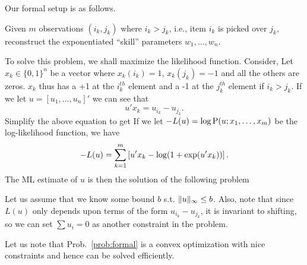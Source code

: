 \documentclass[letterpaper, 11pt, reqno]{amsart}
\begin{document}
Our formal setup is as follows.
\begin{problem}
\label{prob:formal}
Given $m$ observations $(i_k, j_k)$ where $i_k > j_k$, i.e., item $i_k$ is picked over $j_k$, reconstruct the exponentiated ``skill'' parameters $w_1, \ldots, w_n$.
\end{problem}
To solve this problem, we shall maximize the likelihood function. Consider,
Let $x_k \in \{ 0,1\}^n$ be a vector where $x_k(i_k) = 1$, $x_k(j_k) = -1$ and all the others are zeros. $x_k$ thus has a +1 at the $i_k^{th}$ element and a -1 at the $j_k^{th}$ element if $i_k > j_k$. If we let $u = [u_1, \ldots, u_n]'$ we can see that
$$
u' x_k = u_{i_k} - u_{j_k}.
$$
Simplify the above equation to get
If we let $-L(u) = \log \P(u; x_1, \ldots, x_m)$ be the log-likelihood function, we have
$$
-L(u) = \sum_{k=1}^m \sqbrac{u' x_k - \log(1+\exp(u'x_k))}.
$$
The ML estimate of $u$ is then the solution of the following problem
\begin{remark}
Let us assume that we know some bound $b$ s.t. $\norm{u}_\infty \leq b$. Also, note that since $L(u)$ only depends upon terms of the form $u_{i_k} - u_{j_k}$, it is invariant to shifting, so we can set $\sum u_i = 0$ as another constraint in the problem.

Let us note that Prob.~\ref{prob:formal} is a convex optimization with nice constraints and hence can be solved efficiently.
\end{remark}
\end{document}
